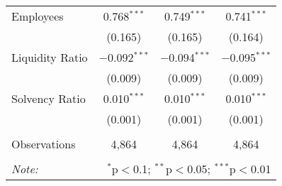 \begin{table}[!htbp]
\begin{tabular}{@{\extracolsep{5pt}}lccc}
 Employees & 0.768$^{***}$ & 0.749$^{***}$ & 0.741$^{***}$ \\ 
  & (0.165) & (0.165) & (0.164) \\ 
 
 Liquidity Ratio & $-$0.092$^{***}$ & $-$0.094$^{***}$ & $-$0.095$^{***}$ \\ 
  & (0.009) & (0.009) & (0.009) \\ 
  
 Solvency Ratio & 0.010$^{***}$ & 0.010$^{***}$ & 0.010$^{***}$ \\ 
  & (0.001) & (0.001) & (0.001) \\ 

\hline \\[-1.8ex] 
Observations & 4,864 & 4,864 & 4,864 \\
\hline 
\hline \\[-1.8ex] 
\textit{Note:}  & \multicolumn{3}{r}{$^{*}$p$<$0.1; $^{**}$p$<$0.05; $^{***}$p$<$0.01} \\ 
\end{tabular} 
\end{table} 
